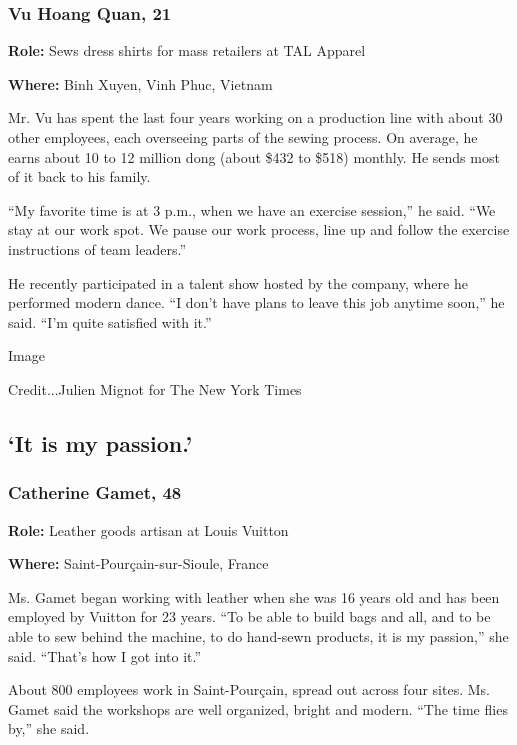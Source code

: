\hypertarget{vu-hoang-quan-21}{%
\subsubsection{Vu Hoang Quan, 21}\label{vu-hoang-quan-21}}

\textbf{Role:} Sews dress shirts for mass retailers at TAL Apparel

\textbf{Where:} Binh Xuyen, Vinh Phuc, Vietnam

Mr. Vu has spent the last four years working on a production line with
about 30 other employees, each overseeing parts of the sewing process.
On average, he earns about 10 to 12 million dong (about \$432 to \$518)
monthly. He sends most of it back to his family.

``My favorite time is at 3 p.m., when we have an exercise session,'' he
said. ``We stay at our work spot. We pause our work process, line up and
follow the exercise instructions of team leaders.''

He recently participated in a talent show hosted by the company, where
he performed modern dance. ``I don't have plans to leave this job
anytime soon,'' he said. ``I'm quite satisfied with it.''

Image

Credit...Julien Mignot for The New York Times

\hypertarget{it-is-my-passion}{%
\subsection{`It is my passion.'}\label{it-is-my-passion}}

\hypertarget{catherine-gamet-48}{%
\subsubsection{Catherine Gamet, 48}\label{catherine-gamet-48}}

\textbf{Role:} Leather goods artisan at Louis Vuitton

\textbf{Where:} Saint-Pourçain-sur-Sioule, France

Ms. Gamet began working with leather when she was 16 years old and has
been employed by Vuitton for 23 years. ``To be able to build bags and
all, and to be able to sew behind the machine, to do hand-sewn products,
it is my passion,'' she said. ``That's how I got into it.''

About 800 employees work in Saint-Pourçain, spread out across four
sites. Ms. Gamet said the workshops are well organized, bright and
modern. ``The time flies by,'' she said.


